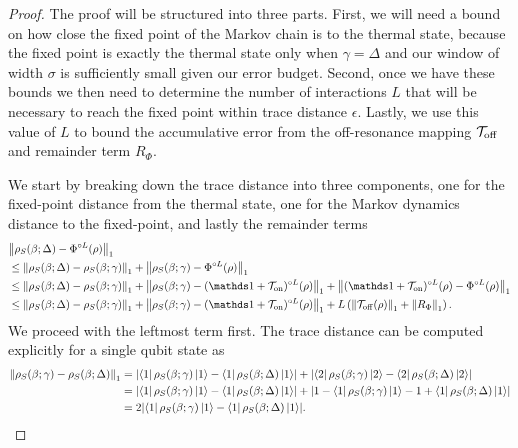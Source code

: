 \begin{proof}
    The proof will be structured into three parts. First, we will need a bound on how close the fixed point of the Markov chain is to the thermal state, because  the fixed point  is exactly the thermal state only when $\gamma = \Delta$ and our window of width $\sigma$ is sufficiently small given our error budget. Second, once we have these bounds we then need to determine the number of interactions $L$ that will be necessary to reach the fixed point within trace distance $\epsilon$. Lastly, we use this value of $L$ to bound the accumulative error from the off-resonance mapping $\mathcal{T}_{\rm off}$ and remainder term $R_{\Phi}$.

    We start by breaking down the trace distance into three components, one for the fixed-point distance from the thermal state, one for the Markov dynamics distance to the fixed-point, and lastly the remainder terms
    \begin{align}
        &\norm{\rho_S(\beta; \Delta) - \Phi^{\circ L}(\rho)}_1 \nonumber \\
        &\le \norm{\rho_S(\beta; \Delta) - \rho_S(\beta; \gamma)}_1 + \norm{\rho_S(\beta; \gamma) - \Phi^{\circ L}(\rho)}_1 \\
        &\le \norm{\rho_S(\beta; \Delta) - \rho_S(\beta; \gamma)}_1 + \norm{\rho_S(\beta; \gamma) - (\identity + \mathcal{T}_{\on})^{\circ L}(\rho)}_1 + \norm{(\identity + \mathcal{T}_{\on})^{\circ L}(\rho) - \Phi^{\circ L}(\rho)}_1 \\
        &\le \norm{\rho_S(\beta; \Delta) - \rho_S(\beta; \gamma)}_1 + \norm{\rho_S(\beta; \gamma) - (\identity + \mathcal{T}_{\on})^{\circ L}(\rho)}_1 +  L \left(\norm{\mathcal{T}_{\off}(\rho)}_1 + \norm{R_{\Phi}}_1 \right). \label{eq:single_qubit_three_errors}
    \end{align}
    We proceed with the leftmost term first. The trace distance can be computed explicitly for a single qubit state as 
 \begin{align}
     \norm{\rho_S(\beta; \gamma) - \rho_S(\beta; \Delta)}_1 &= \abs{\bra{1} \rho_S(\beta; \gamma) \ket{1} - \bra{1}\rho_S(\beta;\Delta)\ket{1}} + \abs{\bra{2} \rho_S(\beta; \gamma) \ket{2} - \bra{2}\rho_S(\beta; \Delta)\ket{2}} \\
     &= \abs{\bra{1} \rho_S(\beta; \gamma) \ket{1} - \bra{1}\rho_S(\beta; \Delta)\ket{1}} + \abs{1 - \bra{1} \rho_S(\beta; \gamma) \ket{1} -1 + \bra{1}\rho_S(\beta; \Delta)\ket{1}} \\
     &= 2 \abs{\bra{1} \rho_S(\beta; \gamma) \ket{1} - \bra{1}\rho_S(\beta; \Delta)\ket{1}}. \label{eq:single_qubit_int_1}

\end{align}
\end{proof}
